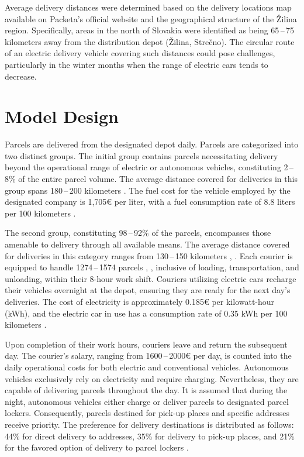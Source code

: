 \documentclass[a4paper, 11pt, a4paper]{article}
\begin{document}
Average delivery distances were determined based on the delivery locations map available on Packeta's official website \cite{packeta} and the geographical 
structure of the Žilina region. Specifically, areas in the north of Slovakia were identified as being 65\,--\,75 kilometers away from the 
distribution depot (Žilina, Strečno). The circular route of an electric delivery vehicle covering such distances could pose challenges, 
particularly in the winter months when the range of electric cars tends to decrease.


\section{Model Design}

Parcels are delivered from the designated depot daily. Parcels are categorized into two distinct groups. The initial group contains parcels 
necessitating delivery beyond the operational range of electric or autonomous vehicles, constituting 2\,--\,8\% \cite{packeta} of the entire parcel volume. 
The average distance covered for deliveries in this group spans 180\,--\,200 kilometers \cite{packeta}. The fuel cost for the vehicle employed by the designated 
company is 1,705€ per liter, with a fuel consumption rate of 8.8 liters per 100 kilometers \cite{peugeot}.

The second group, constituting 98\,--\,92\% \cite{packeta} of the parcels, encompasses those amenable to delivery through all available means. The average distance 
covered for deliveries in this category ranges from 130\,--\,150 kilometers \cite{packeta}, \cite{delivery.distance}. Each courier is equipped to handle 1274\,--\,1574 parcels \cite{parcels.num}, \cite{delivery.percentage}, inclusive of loading, 
transportation, and unloading, within their 8-hour work shift. Couriers utilizing electric cars recharge their vehicles overnight at the depot, ensuring 
they are ready for the next day's deliveries. The cost of electricity is approximately 0.185€ per kilowatt-hour (kWh), and the electric car in use has a 
consumption rate of 0.35 kWh per 100 kilometers \cite{peugeot}.

Upon completion of their work hours, couriers leave and return the subsequent day. The courier's salary, ranging from 1600\,--\,2000€ per day, is counted into 
the daily operational costs for both electric and conventional vehicles. Autonomous vehicles exclusively rely on electricity and require charging. 
Nevertheless, they are capable of delivering parcels throughout the day. It is assumed that during the night, autonomous vehicles either 
charge or deliver parcels to designated parcel lockers. Consequently, parcels destined for pick-up places and specific addresses receive priority. 
The preference for delivery destinations is distributed as follows: 44\% for direct delivery to addresses, 35\% for delivery to pick-up places, 
and 21\% for the favored option of delivery to parcel lockers \cite{delivery.percentage}.
\end{document}
